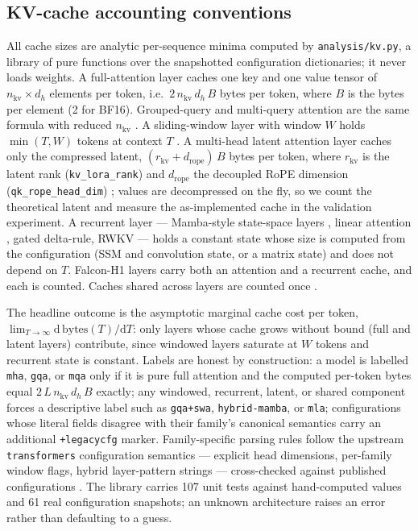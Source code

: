\subsection{KV-cache accounting conventions}\label{dm:kv}
All cache sizes are analytic per-sequence minima computed by \texttt{analysis/kv.py}, a
library of pure functions over the snapshotted configuration dictionaries; it never loads
weights. A full-attention layer caches one key and one value tensor of
$n_{\mathrm{kv}} \times d_h$ elements per token, i.e.\ $2\,n_{\mathrm{kv}}\,d_h\,B$ bytes
per token, where $B$ is the bytes per element (2 for BF16). Grouped-query and multi-query
attention are the same formula with reduced $n_{\mathrm{kv}}$
\cite{shazeer2019mqa,ainslie2023gqa}. A sliding-window layer with window $W$ holds
$\min(T,W)$ tokens at context $T$ \cite{jiang2023mistral}. A multi-head latent attention
layer caches only the compressed latent, $(r_{\mathrm{kv}}+d_{\mathrm{rope}})\,B$ bytes
per token, where $r_{\mathrm{kv}}$ is the latent rank (\texttt{kv\_lora\_rank}) and
$d_{\mathrm{rope}}$ the decoupled RoPE dimension (\texttt{qk\_rope\_head\_dim})
\cite{deepseekai2024v2}; values are decompressed on the fly, so we count the theoretical
latent and measure the as-implemented cache in the validation experiment. A recurrent
layer --- Mamba-style state-space layers \cite{gu2023mamba}, linear attention
\cite{katharopoulos2020linear}, gated delta-rule, RWKV --- holds a constant state whose
size is computed from the configuration (SSM and convolution state, or a matrix state) and
does not depend on $T$. Falcon-H1 layers carry both an attention and a recurrent cache,
and each is counted. Caches shared across layers are counted once \cite{sun2024yoco}.

The headline outcome is the asymptotic marginal cache cost per token,
$\lim_{T\to\infty}\mathrm{d}\,\mathrm{bytes}(T)/\mathrm{d}T$: only layers whose cache grows
without bound (full and latent layers) contribute, since windowed layers saturate at $W$
tokens and recurrent state is constant. Labels are honest by construction: a model is
labelled \texttt{mha}, \texttt{gqa}, or \texttt{mqa} only if it is pure full attention and
the computed per-token bytes equal $2\,L\,n_{\mathrm{kv}}\,d_h\,B$ exactly; any windowed,
recurrent, latent, or shared component forces a descriptive label such as
\texttt{gqa+swa}, \texttt{hybrid-mamba}, or \texttt{mla}; configurations whose literal
fields disagree with their family's canonical semantics carry an additional
\texttt{+legacycfg} marker. Family-specific parsing rules
follow the upstream \texttt{transformers} configuration semantics --- explicit head
dimensions, per-family window flags, hybrid layer-pattern strings --- cross-checked against
published configurations \cite{grattafiori2024llama3,yang2025qwen3}. The library carries
107 unit tests against hand-computed values and 61 real configuration snapshots; an
unknown architecture raises an error rather than defaulting to a guess.

